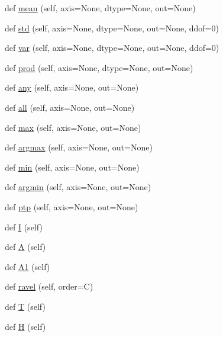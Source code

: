 \begin{DoxyCompactItemize}
\item 
def \hyperlink{classnumpy_1_1matrixlib_1_1defmatrix_1_1matrix_a440dd85288f80f465e1cccfb9fbb2307}{mean} (self, axis=None, dtype=None, out=None)
\item 
def \hyperlink{classnumpy_1_1matrixlib_1_1defmatrix_1_1matrix_ad892947d8e70c5aaf1fee9567f6817ff}{std} (self, axis=None, dtype=None, out=None, ddof=0)
\item 
def \hyperlink{classnumpy_1_1matrixlib_1_1defmatrix_1_1matrix_a6277398ac4c8b97fb15dc9299d1c8cec}{var} (self, axis=None, dtype=None, out=None, ddof=0)
\item 
def \hyperlink{classnumpy_1_1matrixlib_1_1defmatrix_1_1matrix_a535c299ae7a76c1193778f7664311be3}{prod} (self, axis=None, dtype=None, out=None)
\item 
def \hyperlink{classnumpy_1_1matrixlib_1_1defmatrix_1_1matrix_a51872cb8f9b78d599087930019515e6e}{any} (self, axis=None, out=None)
\item 
def \hyperlink{classnumpy_1_1matrixlib_1_1defmatrix_1_1matrix_ac90915ca30bbddf0387f79359414f7a5}{all} (self, axis=None, out=None)
\item 
def \hyperlink{classnumpy_1_1matrixlib_1_1defmatrix_1_1matrix_aa384de862290cc3463f2f5add565961b}{max} (self, axis=None, out=None)
\item 
def \hyperlink{classnumpy_1_1matrixlib_1_1defmatrix_1_1matrix_a3695eced42ed9df40c9b9085fbd7de60}{argmax} (self, axis=None, out=None)
\item 
def \hyperlink{classnumpy_1_1matrixlib_1_1defmatrix_1_1matrix_a9e710255644a156e0601245c609a2d53}{min} (self, axis=None, out=None)
\item 
def \hyperlink{classnumpy_1_1matrixlib_1_1defmatrix_1_1matrix_ad6c00839e0d621fb99a4b47bcc0edf72}{argmin} (self, axis=None, out=None)
\item 
def \hyperlink{classnumpy_1_1matrixlib_1_1defmatrix_1_1matrix_aed051434255d006b61fcf5ab31acb0aa}{ptp} (self, axis=None, out=None)
\item 
def \hyperlink{classnumpy_1_1matrixlib_1_1defmatrix_1_1matrix_a18a1351ce035e744ab1f9e4ad5917424}{I} (self)
\item 
def \hyperlink{classnumpy_1_1matrixlib_1_1defmatrix_1_1matrix_a7b2e7b30492180eef2fd5e68997c9b1b}{A} (self)
\item 
def \hyperlink{classnumpy_1_1matrixlib_1_1defmatrix_1_1matrix_a1fcd626410a038b6250822f00cfc6df5}{A1} (self)
\item 
def \hyperlink{classnumpy_1_1matrixlib_1_1defmatrix_1_1matrix_aa698bcd00a99ee2ca0dcf9a2d2770eff}{ravel} (self, order=\textquotesingle{}C\textquotesingle{})
\item 
def \hyperlink{classnumpy_1_1matrixlib_1_1defmatrix_1_1matrix_a79e011e9fb401c2c1b985bee28bc28eb}{T} (self)
\item 
def \hyperlink{classnumpy_1_1matrixlib_1_1defmatrix_1_1matrix_a54bbfef0f755718648e885537a9b998f}{H} (self)
\end{DoxyCompactItemize}
